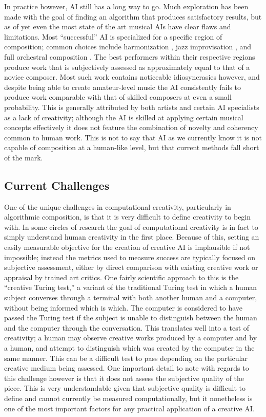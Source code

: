 \documentclass[ author={Stephen Livermore-Tozer},
				supervisor={Dr. Peter Flach},
				degree={MEng},
				title={Performing Algorithmic Co-composition Using Machine Learning},
				subtitle={},
				type={research},
				year={2016} ]{dissertation}
\begin{document}
	In practice however, AI still has a long way to go. Much exploration has been made with the goal of finding an algorithm that produces satisfactory results, but as of yet even the most state of the art musical AIs have clear flaws and limitations. Most ``successful'' AI is specialized for a specific region of composition; common choices include harmonization \cite{freitas2011melody}, jazz improvisation \cite{franklin2001multi}, and full orchestral composition \cite{diaz2011composing}. The best performers within their respective regions produce work that is subjectively assessed as approximately equal to that of a novice composer. Most such work contains noticeable idiosyncrasies however, and despite being able to create amateur-level music the AI consistently fails to produce work comparable with that of skilled composers at even a small probability. This is generally attributed by both artists and certain AI specialists as a lack of creativity; although the AI is skilled at applying certain musical concepts effectively it does not feature the combination of novelty and coherency common to human work. This is not to say that AI as we currently know it is not capable of composition at a human-like level, but that current methods fall short of the mark.
	
	\subsection{Current Challenges}
	
	One of the unique challenges in computational creativity, particularly in algorithmic composition, is that it is very difficult to define creativity to begin with. In some circles of research the goal of computational creativity is in fact to simply understand human creativity in the first place. Because of this, setting an easily measurable objective for the creation of creative AI is implausible if not impossible; instead the metrics used to measure success are typically focused on subjective assessment, either by direct comparison with existing creative work or appraisal by trained art critics. One fairly scientific approach to this is the ``creative Turing test,'' a variant of the traditional Turing test in which a human subject converses through a terminal with both another human and a computer, without being informed which is which. The computer is considered to have passed the Turing test if the subject is unable to distinguish between the human and the computer through the conversation. This translates well into a test of creativity; a human may observe creative works produced by a computer and by a human, and attempt to distinguish which was created by the computer in the same manner. This can be a difficult test to pass depending on the particular creative medium being assessed. One important detail to note with regards to this challenge however is that it does not assess the subjective quality of the piece. This is very understandable given that subjective quality is difficult to define and cannot currently be measured computationally, but it nonetheless is one of the most important factors for any practical application of a creative AI.
	
\end{document}
